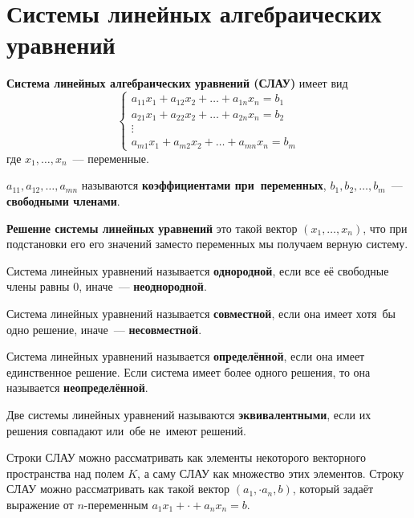 \section{Системы линейных алгебраических уравнений}
\textbf{Система линейных алгебраических уравнений (СЛАУ)} имеет вид
\begin{equation*}
\begin{cases}
a_{11}x_1 + a_{12}x_2 + \dots + a_{1n}x_n = b_1 \\
a_{21}x_1 + a_{22}x_2 + \dots + a_{2n}x_n = b_2 \\
\vdots \\
a_{m1}x_1 + a_{m2}x_2 + \dots + a_{mn}x_n = b_m
\end{cases}
\end{equation*}
где $x_1, \ldots, x_n$~--- переменные.

$a_{11}, a_{12}, \ldots, a_{mn}$ называются \textbf{коэффициентами при~переменных}, $b_1, b_2, \dots, b_m$~--- \textbf{свободными членами}.

\textbf{Решение системы линейных уравнений} это такой вектор $(x_1, \ldots, x_n)$, что при подстановки его его значений заместо переменных мы получаем верную систему.

Система линейных уравнений называется \textbf{однородной}, если все её свободные члены равны 0, иначе~--- \textbf{неоднородной}.

Система линейных уравнений называется \textbf{совместной}, если она имеет хотя~бы одно решение, иначе~--- \textbf{несовместной}.

Система линейных уравнений называется \textbf{определённой}, если она имеет единственное решение.
Если система имеет более одного решения, то она называется \textbf{неопределённой}.

Две системы линейных уравнений называются \textbf{эквивалентными}, если их решения совпадают или~обе не~имеют решений.

Строки СЛАУ можно рассматривать как элементы некоторого векторного пространства над полем $K$, а саму СЛАУ как множество этих элементов. Строку СЛАУ можно рассматривать как такой вектор $(a_1, \cdot a_n, b)$, который задаёт выражение от $n$-переменным $a_1 x_1 + \cdot + a_n x_n = b$.

